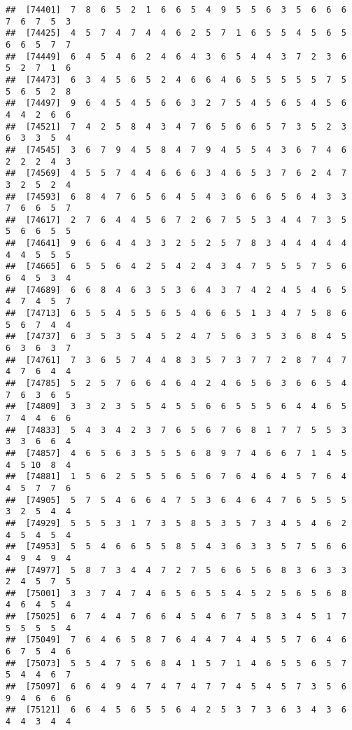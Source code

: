 \documentclass[
]{book}
\begin{document}
\begin{verbatim}
##  [74401]  7  8  6  5  2  1  6  6  5  4  9  5  5  6  3  5  6  6  6  7  6  7  5  3
##  [74425]  4  5  7  4  7  4  4  6  2  5  7  1  6  5  5  4  5  6  5  6  6  5  7  7
##  [74449]  6  4  5  4  6  2  4  6  4  3  6  5  4  4  3  7  2  3  6  5  2  7  1  6
##  [74473]  6  3  4  5  6  5  2  4  6  6  4  6  5  5  5  5  5  7  5  5  6  5  2  8
##  [74497]  9  6  4  5  4  5  6  6  3  2  7  5  4  5  6  5  4  5  6  4  4  2  6  6
##  [74521]  7  4  2  5  8  4  3  4  7  6  5  6  6  5  7  3  5  2  3  6  3  3  5  4
##  [74545]  3  6  7  9  4  5  8  4  7  9  4  5  5  4  3  6  7  4  6  2  2  2  4  3
##  [74569]  4  5  5  7  4  4  6  6  6  3  4  6  5  3  7  6  2  4  7  3  2  5  2  4
##  [74593]  6  8  4  7  6  5  6  4  5  4  3  6  6  6  5  6  4  3  3  7  6  6  5  7
##  [74617]  2  7  6  4  4  5  6  7  2  6  7  5  5  3  4  4  7  3  5  5  6  6  5  5
##  [74641]  9  6  6  4  4  3  3  2  5  2  5  7  8  3  4  4  4  4  4  4  4  5  5  5
##  [74665]  6  5  5  6  4  2  5  4  2  4  3  4  7  5  5  5  7  5  6  6  4  5  3  4
##  [74689]  6  6  8  4  6  3  5  3  6  4  3  7  4  2  4  5  4  6  5  4  7  4  5  7
##  [74713]  6  5  5  4  5  5  6  5  4  6  6  5  1  3  4  7  5  8  6  5  6  7  4  4
##  [74737]  6  3  5  3  5  4  5  2  4  7  5  6  3  5  3  6  8  4  5  6  3  6  3  7
##  [74761]  7  3  6  5  7  4  4  8  3  5  7  3  7  7  2  8  7  4  7  4  7  6  4  4
##  [74785]  5  2  5  7  6  6  4  6  4  2  4  6  5  6  3  6  6  5  4  7  6  3  6  5
##  [74809]  3  3  2  3  5  5  4  5  5  6  6  5  5  5  6  4  4  6  5  7  4  4  6  6
##  [74833]  5  4  3  4  2  3  7  6  5  6  7  6  8  1  7  7  5  5  3  3  3  6  6  4
##  [74857]  4  6  5  6  3  5  5  5  6  8  9  7  4  6  6  7  1  4  5  4  5 10  8  4
##  [74881]  1  5  6  2  5  5  5  6  5  6  7  6  4  6  4  5  7  6  4  4  5  7  7  6
##  [74905]  5  7  5  4  6  6  4  7  5  3  6  4  6  4  7  6  5  5  5  3  2  5  4  4
##  [74929]  5  5  5  3  1  7  3  5  8  5  3  5  7  3  4  5  4  6  2  4  5  4  5  4
##  [74953]  5  5  4  6  6  5  5  8  5  4  3  6  3  3  5  7  5  6  6  4  9  4  9  4
##  [74977]  5  8  7  3  4  4  7  2  7  5  6  6  5  6  8  3  6  3  3  2  4  5  7  5
##  [75001]  3  3  7  4  7  4  6  5  6  5  5  4  5  2  5  6  5  6  8  4  6  4  5  4
##  [75025]  6  7  4  4  7  6  6  4  5  4  6  7  5  8  3  4  5  1  7  5  5  5  5  4
##  [75049]  7  6  4  6  5  8  7  6  4  4  7  4  4  5  5  7  6  4  6  6  7  5  4  6
##  [75073]  5  5  4  7  5  6  8  4  1  5  7  1  4  6  5  5  6  5  7  5  4  4  6  7
##  [75097]  6  6  4  9  4  7  4  7  4  7  7  4  5  4  5  7  3  5  6  9  4  6  6  6
##  [75121]  6  6  4  5  6  5  5  6  4  2  5  3  7  3  6  3  4  3  6  4  4  3  4  4

\end{verbatim}
\end{document}
